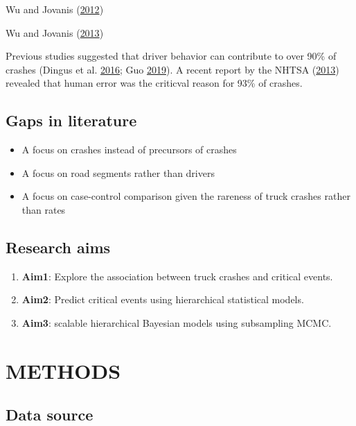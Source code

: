 \documentclass[12pt]{book}
\numberwithin{equation}{chapter}
\providecommand{\tightlist}{%
  \setlength{\itemsep}{0pt}\setlength{\parskip}{0pt}}
\begin{document}
Wu and Jovanis (\protect\hyperlink{ref-wu2012crashes}{2012})

Wu and Jovanis (\protect\hyperlink{ref-wu2013defining}{2013})

Previous studies suggested that driver behavior can contribute to over 90\% of crashes (Dingus et al. \protect\hyperlink{ref-dingus2016driver}{2016}; Guo \protect\hyperlink{ref-guo2019statistical}{2019}). A recent report by the NHTSA (\protect\hyperlink{ref-nhtsa2013national}{2013}) revealed that human error was the criticval reason for 93\% of crashes.

\hypertarget{gaps-in-literature}{%
\section{Gaps in literature}\label{gaps-in-literature}}

\begin{itemize}
\tightlist
\item
  A focus on crashes instead of precursors of crashes
\item
  A focus on road segments rather than drivers
\item
  A focus on case-control comparison given the rareness of truck crashes rather than rates
\end{itemize}

\hypertarget{research-aims}{%
\section{Research aims}\label{research-aims}}

\begin{enumerate}
\def\labelenumi{\arabic{enumi}.}
\item
  \textbf{Aim1}: Explore the association between truck crashes and critical events.
\item
  \textbf{Aim2}: Predict critical events using hierarchical statistical models.
\item
  \textbf{Aim3}: scalable hierarchical Bayesian models using subsampling MCMC.
\end{enumerate}

\hypertarget{methods}{%
\chapter{METHODS}\label{methods}}

\hypertarget{data-source}{%
\section{Data source}\label{data-source}}
\end{document}
